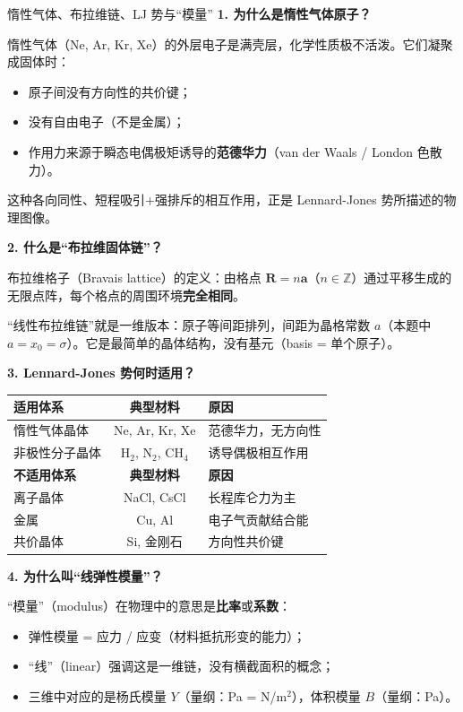 \begin{modelbox}{惰性气体、布拉维链、LJ 势与``模量''}
\textbf{1. 为什么是惰性气体原子？}

惰性气体（Ne, Ar, Kr, Xe）的外层电子是满壳层，化学性质极不活泼。它们凝聚成固体时：
\begin{itemize}[nosep]
  \item 原子间没有方向性的共价键；
  \item 没有自由电子（不是金属）；
  \item 作用力来源于瞬态电偶极矩诱导的\textbf{范德华力}（van der Waals / London 色散力）。
\end{itemize}
这种各向同性、短程吸引+强排斥的相互作用，正是 Lennard-Jones 势所描述的物理图像。

\textbf{2. 什么是``布拉维固体链''？}

布拉维格子（Bravais lattice）的定义：由格点 $\bm{R} = n\bm{a}$（$n \in \mathbb{Z}$）通过平移生成的无限点阵，每个格点的周围环境\textbf{完全相同}。

``线性布拉维链''就是一维版本：原子等间距排列，间距为晶格常数 $a$（本题中 $a = x_0 = \sigma$）。它是最简单的晶体结构，没有基元（basis = 单个原子）。

\textbf{3. Lennard-Jones 势何时适用？}

\begin{center}
\renewcommand{\arraystretch}{1.4}
\begin{tabular}{|l|c|l|}
\hline
\textbf{适用体系} & \textbf{典型材料} & \textbf{原因} \\
\hline
惰性气体晶体 & Ne, Ar, Kr, Xe & 范德华力，无方向性 \\
非极性分子晶体 & $\text{H}_2$, $\text{N}_2$, $\text{CH}_4$ & 诱导偶极相互作用 \\
\hline
\textbf{不适用体系} & \textbf{典型材料} & \textbf{原因} \\
\hline
离子晶体 & NaCl, CsCl & 长程库仑力为主 \\
金属 & Cu, Al & 电子气贡献结合能 \\
共价晶体 & Si, 金刚石 & 方向性共价键 \\
\hline
\end{tabular}
\end{center}

\textbf{4. 为什么叫``线弹性模量''？}

``模量''（modulus）在物理中的意思是\textbf{比率}或\textbf{系数}：
\begin{itemize}[nosep]
  \item 弹性模量 = 应力 / 应变（材料抵抗形变的能力）；
  \item ``线''（linear）强调这是一维链，没有横截面积的概念；
  \item 三维中对应的是杨氏模量 $Y$（量纲：Pa = N/m$^2$），体积模量 $B$（量纲：Pa）。
\end{itemize}
\end{modelbox}

